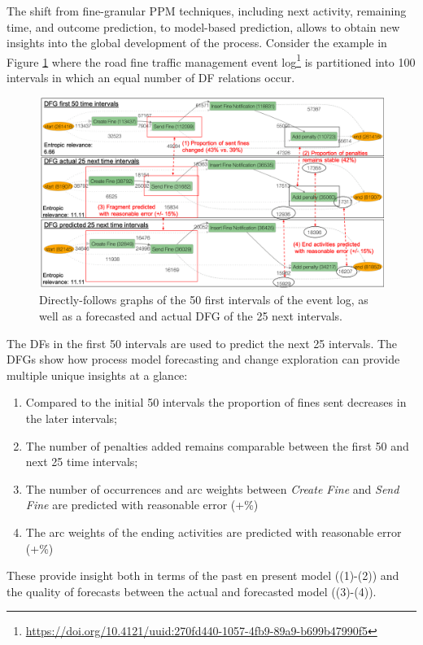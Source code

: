 The shift from fine-granular PPM techniques, including next activity, remaining time, and outcome prediction, to model-based prediction, allows to obtain new insights into the global development of the process.
Consider the example in Figure \ref{fig:dfg_example_intro} where the road fine traffic management event log\footnote{\url{https://doi.org/10.4121/uuid:270fd440-1057-4fb9-89a9-b699b47990f5}} is partitioned into 100 intervals in which an equal number of DF relations occur.
\begin{figure}
    \centering
    \includegraphics[width=\textwidth]{img/MotExample.png}
    \caption{Directly-follows graphs of the 50 first intervals of the event log, as well as a forecasted and actual DFG of the 25 next intervals.}
    \label{fig:dfg_example_intro}
\end{figure}
The DFs in the first 50 intervals are used to predict the next 25 intervals.
The DFGs show how process model forecasting and change exploration can provide multiple unique insights at a glance:
\begin{enumerate}
    \item Compared to the initial 50 intervals the proportion of fines sent decreases in the later intervals;
    \item The number of penalties added remains comparable between the first 50 and next 25 time intervals;
    \item The number of occurrences and arc weights between \emph{Create Fine} and \emph{Send Fine} are predicted with reasonable error (+\%)
    \item The arc weights of the ending activities are predicted with reasonable error (+\%)
\end{enumerate}
These provide insight both in terms of the past en present model ((1)-(2)) and the quality of forecasts between the actual and forecasted model ((3)-(4)).
